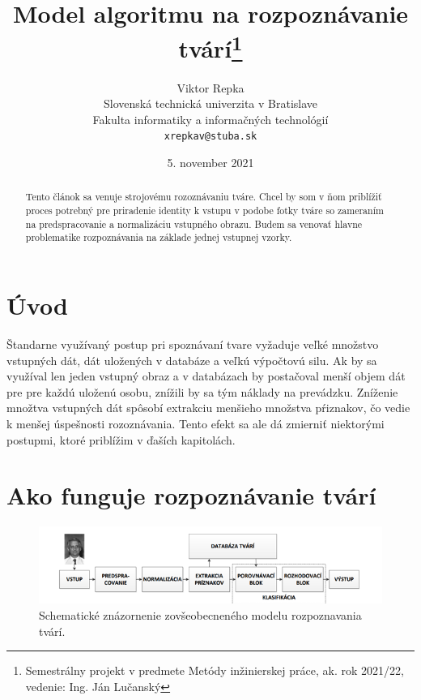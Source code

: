 \documentclass[10pt,twoside,slovak,a4paper]{article}
\title{Model algoritmu na rozpoznávanie tvárí\thanks{Semestrálny projekt v predmete Metódy inžinierskej práce, ak. rok 2021/22, vedenie: Ing. Ján Lučanský}} %
\author{Viktor Repka\\[2pt]
	{\small Slovenská technická univerzita v Bratislave}\\
	{\small Fakulta informatiky a informačných technológií}\\
	{\small \texttt{xrepkav@stuba.sk}}
	}
\date{\small 5. november 2021} %
\begin{document}
\maketitle

\begin{abstract}

Tento článok sa venuje strojovému rozoznávaniu tváre. Chcel by som v ňom priblížiť proces potrebný pre priradenie identity k vstupu v podobe fotky tváre so zameraním na predspracovanie a normalizáciu vstupného obrazu. Budem sa venovať hlavne problematike rozpoznávania na základe jednej vstupnej vzorky. 
\end{abstract}

\pagebreak

\section{Úvod}

Štandarne využívaný postup pri spoznávaní tvare vyžaduje veľké množstvo vstupných dát, dát uložených v databáze a veľkú výpočtovú silu. Ak by sa využíval len jeden vstupný obraz a v databázach by postačoval menší objem dát pre pre každú uloženú osobu, znížili by sa tým náklady na prevádzku. 
Zníženie množtva vstupných dát spôsobí extrakciu menšieho množstva pŕiznakov, čo vedie k menšej úspešnosti rozoznávania. Tento efekt sa ale dá zmierniť niektorými postupmi, ktoré priblížim v ďaších kapitolách. 

\section{Ako funguje rozpoznávanie tvárí}

\begin{figure}[tbh]
\centering
\includegraphics[width=\textwidth]{Picture3.png}
\caption{Schematické znázornenie zovšeobecneného modelu rozpoznavania tvárí.\cite{Ban1}}
\label{f:facerecmod}
\end{figure}
\end{document}
